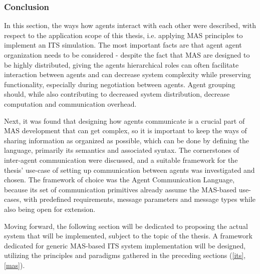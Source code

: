 \documentclass[main.tex]{subfiles}
\begin{document}
\subsubsection{Conclusion}

In this section, the ways how agents interact with each other were described, with respect to the
application scope of this thesis, i.e. applying MAS principles to implement an ITS simulation. The most important
facts are that agent agent organization needs to be considered - despite the fact that MAS are
designed to be highly distributed, giving the agents hierarchical roles can often facilitate
interaction between agents and can decrease system complexity while preserving functionality,
especially during negotiation between agents. Agent grouping should, while also contributing to
decreased system distribution, decrease computation and communication overhead. 

Next, it was found that designing how agents communicate is a crucial part of MAS development
that can get complex, so it is important to keep the ways of sharing information as organized
as possible, which can be done by defining the language, primarily its semantics and associated
syntax.  The cornerstones of inter-agent communication were discussed, and a suitable framework
for the thesis' use-case of setting up communication between agents was investigated and
chosen. The framework of choice was the Agent Communication Language, because its set of
communication primitives already assume the MAS-based use-cases, with predefined requirements,
message parameters and message types while also being open for extension.

Moving forward, the following section will be dedicated to proposing the actual system that will 
be implemented, subject to the topic of the thesis. A framework dedicated for generic MAS-based 
ITS system implementation will be designed, utilizing the principles and paradigms gathered in 
the preceding sections (\ref{its},\ref{mas}).
\end{document}
